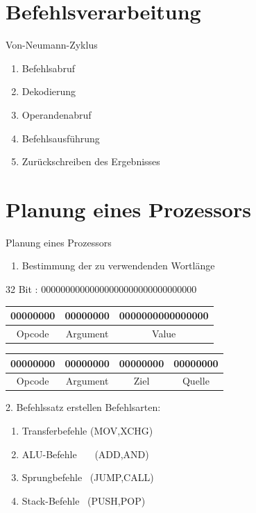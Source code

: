 \documentclass{beamer}
\begin{document}
\section{Befehlsverarbeitung}
\begin{frame}{Von-Neumann-Zyklus}
\begin{enumerate}\pause
\item{Befehlsabruf}\pause
\item{Dekodierung}\pause
\item{Operandenabruf}\pause
\item{Befehlsausf\"uhrung}\pause
\item{Zur\"uckschreiben des Ergebnisses}
\end{enumerate}
\end{frame}

\section{Planung eines Prozessors}

\begin{frame}[t]{Planung eines Prozessors}
\begin{enumerate}
\item{Bestimmung der zu verwendenden Wortl\"ange}
\end{enumerate}
32 Bit : 00000000000000000000000000000000
\centering 
\pause
\begin{table}[]
\centering
\begin{tabular}{|c|c|c|}
\hline
00000000 & 00000000 & 0000000000000000 \\ \hline
Opcode   & Argument & Value            \\ \hline
\end{tabular}
\end{table}
\smallskip
\pause
\centering
\begin{table}[]
\centering
\begin{tabular}{|c|c|c|c|}
\hline
00000000 & 00000000 & 00000000 & 00000000 \\ \hline
Opcode   & Argument & Ziel     & Quelle   \\ \hline
\end{tabular}
\end{table}
\end{frame}

\begin{frame}[t]{2. Befehlssatz erstellen}\pause
Befehlsarten:
\bigskip
\center
\begin{enumerate}
\item{Transferbefehle  (MOV,XCHG)}
\item{ALU-Befehle \ \ \ (ADD,AND)}
\item{Sprungbefehle  \  (JUMP,CALL)}
\item{Stack-Befehle \ (PUSH,POP)}
\end{enumerate}
\end{frame}
\end{document}
